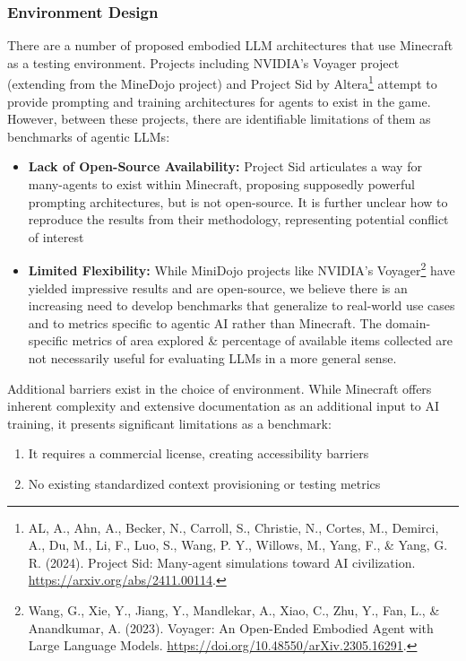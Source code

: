\documentclass{article}
\begin{document}
\subsubsection{Environment Design}
There are a number of proposed embodied LLM architectures that use Minecraft as a testing environment.
Projects including NVIDIA's Voyager project (extending from the MineDojo project) and Project Sid by Altera\footnote{AL, A., Ahn, A., Becker, N., Carroll, S., Christie, N., Cortes, M., Demirci, A., Du, M., Li, F., Luo, S., Wang, P. Y., Willows, M., Yang, F., \& Yang, G. R. (2024). Project Sid: Many-agent simulations toward AI civilization. \url{https://arxiv.org/abs/2411.00114}.} attempt to provide prompting and training architectures for agents to exist in the game.
However, between these projects, there are identifiable limitations of them as benchmarks of agentic LLMs:
\begin{itemize}
    \item \textbf{Lack of Open-Source Availability:}
          Project Sid articulates a way for many-agents to exist within Minecraft, proposing supposedly powerful prompting architectures, but is not open-source.
          It is further unclear how to reproduce the results from their methodology, representing potential conflict of interest
    \item \textbf{Limited Flexibility:}
          While MiniDojo projects like NVIDIA's Voyager\footnote{Wang, G., Xie, Y., Jiang, Y., Mandlekar, A., Xiao, C., Zhu, Y., Fan, L., \& Anandkumar, A. (2023). Voyager: An Open-Ended Embodied Agent with Large Language Models. \url{https://doi.org/10.48550/arXiv.2305.16291}.} have yielded impressive results and are open-source, we believe there is an increasing need to develop benchmarks that generalize to real-world use cases and to metrics specific to agentic AI rather than Minecraft.
          The domain-specific metrics of area explored \& percentage of available items collected are not necessarily useful for evaluating LLMs in a more general sense.
\end{itemize}

Additional barriers exist in the choice of environment.
While Minecraft offers inherent complexity and extensive documentation as an additional input to AI training, it presents significant limitations as a benchmark:
\begin{enumerate}
    \item It requires a commercial license, creating accessibility barriers
    \item No existing standardized context provisioning or testing metrics
\end{enumerate}
\end{document}
